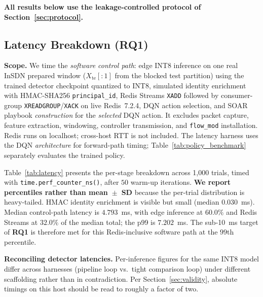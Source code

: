 \documentclass[conference,a4paper]{IEEEtran}
\begin{document}
\textbf{All results below use the leakage-controlled protocol of Section~\ref{sec:protocol}.}

\subsection{Latency Breakdown (RQ1)}
\textbf{Scope.} We time the \emph{software control path}: edge INT8 inference on one real InSDN prepared window ($X_{\mathrm{te}}[:1]$ from the blocked test partition) using the trained detector checkpoint quantized to INT8, simulated identity enrichment with HMAC-SHA256 \texttt{principal\_id}, Redis Streams \texttt{XADD} followed by consumer-group \texttt{XREADGROUP}/\texttt{XACK} on live Redis~7.2.4, DQN action selection, and SOAR playbook \emph{construction} for the \emph{selected} DQN action. It excludes packet capture, feature extraction, windowing, controller transmission, and \texttt{flow\_mod} installation. Redis runs on localhost; cross-host RTT is not included. The latency harness uses the DQN \emph{architecture} for forward-path timing; Table~\ref{tab:policy_benchmark} separately evaluates the trained policy.

Table~\ref{tab:latency} presents the per-stage breakdown across 1{,}000 trials, timed with \texttt{time.perf\_counter\_ns()}, after $50$ warm-up iterations. \textbf{We report percentiles rather than mean~$\pm$~SD} because the per-trial distribution is heavy-tailed. HMAC identity enrichment is visible but small (median $0.030$~ms). Median control-path latency is $4.793$~ms, with edge inference at $60.0\%$ and Redis Streams at $32.0\%$ of the median total; the p99 is $7.202$~ms. The sub-10~ms target of \textbf{RQ1} is therefore met for this Redis-inclusive software path at the $99$th percentile.

\textbf{Reconciling detector latencies.} Per-inference figures for the same INT8 model differ across harnesses (pipeline loop vs.\ tight comparison loop) under different scaffolding rather than in contradiction. Per Section~\ref{sec:validity}, absolute timings on this host should be read to roughly a factor of two.
\end{document}
